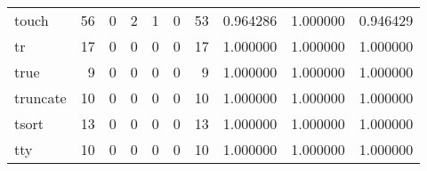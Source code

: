 \begin{tabular}{lrrrrrrrrr}
touch     &                                      56 &                                                  0 &                                                  2 &                                                  1 &                                                  0 &                                                 53 &                                           0.964286 &                               1.000000 &                             0.946429 \\
tr        &                                      17 &                                                  0 &                                                  0 &                                                  0 &                                                  0 &                                                 17 &                                           1.000000 &                               1.000000 &                             1.000000 \\
true      &                                       9 &                                                  0 &                                                  0 &                                                  0 &                                                  0 &                                                  9 &                                           1.000000 &                               1.000000 &                             1.000000 \\
truncate  &                                      10 &                                                  0 &                                                  0 &                                                  0 &                                                  0 &                                                 10 &                                           1.000000 &                               1.000000 &                             1.000000 \\
tsort     &                                      13 &                                                  0 &                                                  0 &                                                  0 &                                                  0 &                                                 13 &                                           1.000000 &                               1.000000 &                             1.000000 \\
tty       &                                      10 &                                                  0 &                                                  0 &                                                  0 &                                                  0 &                                                 10 &                                           1.000000 &                               1.000000 &                             1.000000 \\

\end{tabular}
